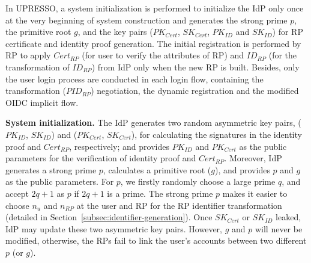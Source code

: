 
In UPRESSO, a system initialization is performed to initialize the IdP only once at the very beginning of system construction and generates the strong prime $p$, the primitive root $g$, and the key pairs ($PK_{Cert}$, $SK_{Cert}$, $PK_{ID}$ and $SK_{ID}$) for RP certificate and identity proof generation. The initial registration is performed by RP to apply $Cert_{RP}$ (for user to verify the attributes of RP) and $ID_{RP}$ (for the transformation of $ID_{RP}$) from IdP only when the new RP is built.
Besides, only the user login process are conducted in each login flow, containing the transformation ($PID_{RP}$) negotiation, the dynamic registration and the modified OIDC implicit flow.

\vspace{1mm}\noindent \textbf{System initialization.} The IdP generates two random asymmetric key pairs, ($PK_{ID}$, $SK_{ID}$) and ($PK_{Cert}$, $SK_{Cert}$),
for calculating the signatures in the identity proof and $Cert_{RP}$, respectively;
and provides $PK_{ID}$ and $PK_{Cert}$ as the public parameters for the verification of identity proof and $Cert_{RP}$.
Moreover, IdP generates a strong prime $p$, calculates  a primitive root ($g$), and provides $p$ and $g$ as the public parameters.
For $p$, we firstly randomly choose a large prime $q$, and accept  $2q+1$ as $p$ if $2q+1$ is a prime.
The strong prime $p$ makes it easier to choose $n_{u}$ and $n_{RP}$ at the user and RP for the RP identifier transformation (detailed in  Section~\ref{subsec:identifier-generation}). %
Once $SK_{Cert}$ or $SK_{ID}$ leaked, IdP may update these two asymmetric key pairs.
However, $g$ and $p$ will never be modified, otherwise, the RPs fail to link the user's accounts between two different $p$ (or $g$).


